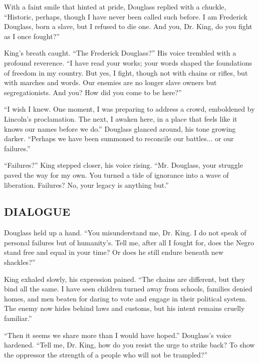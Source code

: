 \documentclass[12pt]{article}
\begin{document}
With a faint smile that hinted at pride, Douglass replied with a chuckle, {\color{douglasscolor}``Historic, perhaps, though I have never been called such before. I am Frederick Douglass, born a slave, but I refused to die one. And you, Dr. King, do you fight as I once fought?''}

King’s breath caught. {\color{kingcolor}``The Frederick Douglass?''} His voice trembled with a profound reverence. {\color{kingcolor}``I have read your works; your words shaped the foundations of freedom in my country. But yes, I fight, though not with chains or rifles, but with marches and words. Our enemies are no longer slave owners but segregationists. And you? How did you come to be here?''}

{\color{douglasscolor}``I wish I knew. One moment, I was preparing to address a crowd, emboldened by Lincoln’s proclamation. The next, I awaken here, in a place that feels like it knows our names before we do.''} Douglass glanced around, his tone growing darker. {\color{douglasscolor}``Perhaps we have been summoned to reconcile our battles... or our failures.''}

{\color{kingcolor}``Failures?''} King stepped closer, his voice rising. {\color{kingcolor}``Mr. Douglass, your struggle paved the way for my own. You turned a tide of ignorance into a wave of liberation. Failures? No, your legacy is anything but.''}

\bigskip
\subsection*{DIALOGUE}


Douglass held up a hand. {\color{douglasscolor}``You misunderstand me, Dr. King. I do not speak of personal failures but of humanity’s. Tell me, after all I fought for, does the Negro stand free and equal in your time? Or does he still endure beneath new shackles?''}

King exhaled slowly, his expression pained. {\color{kingcolor}``The chains are different, but they bind all the same. I have seen children turned away from schools, families denied homes, and men beaten for daring to vote and engage in their political system. The enemy now hides behind laws and customs, but his intent remains cruelly familiar.''}

{\color{douglasscolor}``Then it seems we share more than I would have hoped.''} Douglass’s voice hardened. {\color{douglasscolor}``Tell me, Dr. King, how do you resist the urge to strike back? To show the oppressor the strength of a people who will not be trampled?''}
\end{document}
